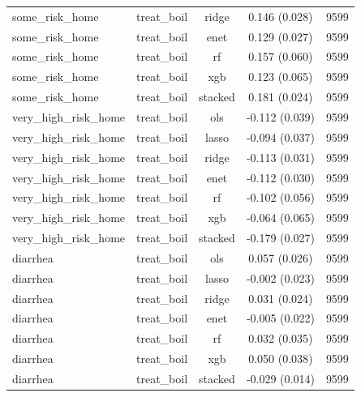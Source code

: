 \begin{table}[htbp]
\begin{tabular}{lcccc}
some_risk_home & treat_boil & ridge & 0.146 (0.028) & 9599 \\
some_risk_home & treat_boil & enet & 0.129 (0.027) & 9599 \\
some_risk_home & treat_boil & rf & 0.157 (0.060) & 9599 \\
some_risk_home & treat_boil & xgb & 0.123 (0.065) & 9599 \\
some_risk_home & treat_boil & stacked & 0.181 (0.024) & 9599 \\
very_high_risk_home & treat_boil & ols & -0.112 (0.039) & 9599 \\
very_high_risk_home & treat_boil & lasso & -0.094 (0.037) & 9599 \\
very_high_risk_home & treat_boil & ridge & -0.113 (0.031) & 9599 \\
very_high_risk_home & treat_boil & enet & -0.112 (0.030) & 9599 \\
very_high_risk_home & treat_boil & rf & -0.102 (0.056) & 9599 \\
very_high_risk_home & treat_boil & xgb & -0.064 (0.065) & 9599 \\
very_high_risk_home & treat_boil & stacked & -0.179 (0.027) & 9599 \\
diarrhea & treat_boil & ols & 0.057 (0.026) & 9599 \\
diarrhea & treat_boil & lasso & -0.002 (0.023) & 9599 \\
diarrhea & treat_boil & ridge & 0.031 (0.024) & 9599 \\
diarrhea & treat_boil & enet & -0.005 (0.022) & 9599 \\
diarrhea & treat_boil & rf & 0.032 (0.035) & 9599 \\
diarrhea & treat_boil & xgb & 0.050 (0.038) & 9599 \\
diarrhea & treat_boil & stacked & -0.029 (0.014) & 9599 \\
\hline
\end{tabular}
\end{table}